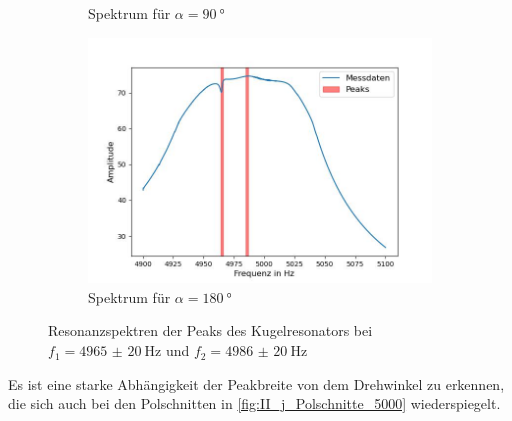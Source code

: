 \documentclass[../main.tex]{subfiles}
\begin{document}
\begin{figure}[H]
\begin{subfigure}[b]{0.45\textwidth}
            \caption{Spektrum für $\alpha=\SI{90}{\degree}$}
            \label{fig:II_i_Resonanzspektrum_90_Grad}
        \end{subfigure}
        \begin{subfigure}[b]{0.45\textwidth}
            \centering
            \includegraphics[width=\textwidth]{Bilddateien/Auswertung/II_i_Resonanzspektrum_180_Grad.jpg}
            \caption{Spektrum für $\alpha=\SI{180}{\degree}$}
            \label{fig:II_i_Resonanzspektrum_180_Grad}
        \end{subfigure}
        \caption{Resonanzspektren der Peaks des Kugelresonators bei $f_1=\SI{4965(20)}{\hertz}$ und $f_2=\SI{4986(20)}{\hertz}$}
        \label{fig:II_i_Resonanzspektren_5000Hz}
    \end{figure}

    Es ist eine starke Abhängigkeit der Peakbreite von dem Drehwinkel zu erkennen, die sich auch bei den Polschnitten in \ref{fig:II_j_Polschnitte_5000} wiederspiegelt.
\end{document}
